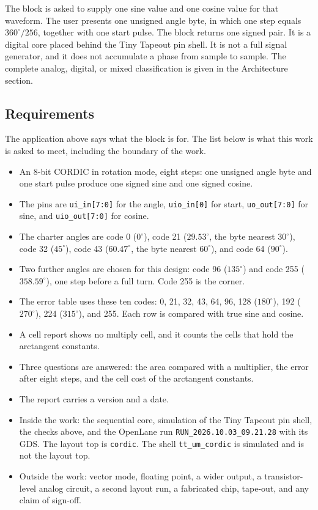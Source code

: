 \documentclass[11pt,a4paper]{article}
\begin{document}
The block is asked to supply one sine value and one cosine value for that waveform. The user presents one unsigned angle byte, in which one step equals \(360^\circ/256\), together with one start pulse. The block returns one signed pair. It is a digital core placed behind the Tiny Tapeout pin shell. It is not a full signal generator, and it does not accumulate a phase from sample to sample. The complete analog, digital, or mixed classification is given in the Architecture section.

\subsection{Requirements}
The application above says what the block is for. The list below is what this work is asked to meet, including the boundary of the work.

\begin{itemize}
  \item An 8-bit CORDIC in rotation mode, eight steps: one unsigned angle byte and one start pulse produce one signed sine and one signed cosine.
  \item The pins are \texttt{ui\_in[7:0]} for the angle, \texttt{uio\_in[0]} for start, \texttt{uo\_out[7:0]} for sine, and \texttt{uio\_out[7:0]} for cosine.
  \item The charter angles are code 0 (\(0^\circ\)), code 21 (\(29.53^\circ\), the byte nearest \(30^\circ\)), code 32 (\(45^\circ\)), code 43 (\(60.47^\circ\), the byte nearest \(60^\circ\)), and code 64 (\(90^\circ\)).
  \item Two further angles are chosen for this design: code 96 (\(135^\circ\)) and code 255 (\(358.59^\circ\)), one step before a full turn. Code 255 is the corner.
  \item The error table uses these ten codes: 0, 21, 32, 43, 64, 96, 128 (\(180^\circ\)), 192 (\(270^\circ\)), 224 (\(315^\circ\)), and 255. Each row is compared with true sine and cosine.
  \item A cell report shows no multiply cell, and it counts the cells that hold the arctangent constants.
  \item Three questions are answered: the area compared with a multiplier, the error after eight steps, and the cell cost of the arctangent constants.
  \item The report carries a version and a date.
  \item Inside the work: the sequential core, simulation of the Tiny Tapeout pin shell, the checks above, and the OpenLane run \texttt{RUN\_2026.10.03\_09.21.28} with its GDS. The layout top is \texttt{cordic}. The shell \texttt{tt\_um\_cordic} is simulated and is not the layout top.
  \item Outside the work: vector mode, floating point, a wider output, a transistor-level analog circuit, a second layout run, a fabricated chip, tape-out, and any claim of sign-off.
\end{itemize}
\end{document}
